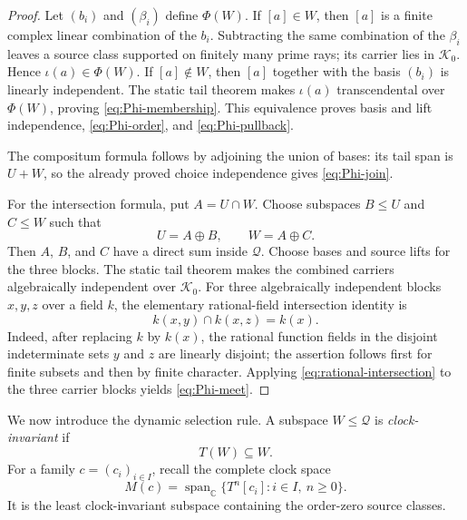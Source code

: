 \documentclass[11pt]{article}
\theoremstyle{definition}
\theoremstyle{remark}
\newcommand{\C}{\mathbb C}
\newcommand{\cK}{\mathcal K}
\newcommand{\cQ}{\mathcal Q}
\begin{document}
\begin{proof}
Let \((b_i)\) and \((\beta_i)\) define \(\Phi(W)\).  If \([a]\in W\), then \([a]\) is a
finite complex linear combination of the \(b_i\).  Subtracting the same combination of the
\(\beta_i\) leaves a source class supported on finitely many prime rays; its carrier lies in
\(\cK_0\).  Hence \(\iota(a)\in\Phi(W)\).  If \([a]\notin W\), then \([a]\) together with the
basis \((b_i)\) is linearly independent.  The static tail theorem makes \(\iota(a)\)
transcendental over \(\Phi(W)\), proving \eqref{eq:Phi-membership}.  This equivalence proves
basis and lift independence, \eqref{eq:Phi-order}, and \eqref{eq:Phi-pullback}.

The compositum formula follows by adjoining the union of bases: its tail span is \(U+W\), so
the already proved choice independence gives \eqref{eq:Phi-join}.

For the intersection formula, put \(A=U\cap W\).  Choose subspaces \(B\leq U\) and \(C\leq W\)
such that
\[
 U=A\oplus B,\qquad W=A\oplus C.
\]
Then \(A\), \(B\), and \(C\) have a direct sum inside \(\cQ\).  Choose bases and source lifts
for the three blocks.  The static tail theorem makes the combined carriers algebraically
independent over \(\cK_0\).  For three algebraically independent blocks \(x,y,z\) over a field
\(k\), the elementary rational-field intersection identity is
\begin{equation}\label{eq:rational-intersection}
  k(x,y)\cap k(x,z)=k(x).
\end{equation}
Indeed, after replacing \(k\) by \(k(x)\), the rational function fields in the disjoint
indeterminate sets \(y\) and \(z\) are linearly disjoint; the assertion follows first for finite
subsets and then by finite character.  Applying \eqref{eq:rational-intersection} to the three
carrier blocks yields \eqref{eq:Phi-meet}.
\end{proof}

We now introduce the dynamic selection rule.  A subspace \(W\leq\cQ\) is
\emph{clock-invariant} if
\begin{equation}\label{eq:invariant}
  T(W)\subseteq W.
\end{equation}
For a family \(c=(c_i)_{i\in I}\), recall the complete clock space
\begin{equation}\label{eq:Mc-master}
  M(c)=\operatorname{span}_{\C}\{T^n[c_i]:i\in I,\ n\geq0\}.
\end{equation}
It is the least clock-invariant subspace containing the order-zero source classes.
\end{document}
